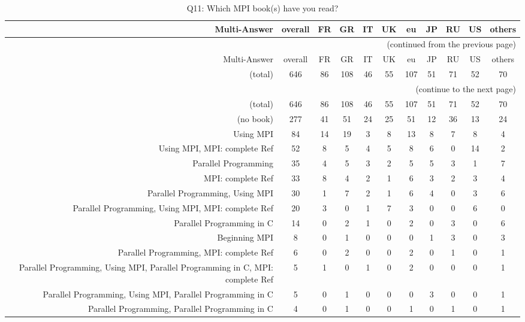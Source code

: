 \clearpage%
{\footnotesize\begin{landscape}%
\begin{longtable}[htb]{r|c|c|c|c|c|c|c|c|c|c}%
\caption{Q11: Which MPI book(s) have you read?}%
\label{tab:Q11-mans} \\%
\hline%
Multi-Answer & overall & FR & GR & IT & UK & eu & JP & RU & US & others \\
 \hline%
\endfirsthead%
\multicolumn{11}{r}{(continued from the previous page)}\\%
\hline%
Multi-Answer & overall & FR & GR & IT & UK & eu & JP & RU & US & others \\
 \hline%
\endhead%
\hline%
(total) & 646 & 86 & 108 & 46 & 55 & 107 & 51 & 71 & 52 & 70 \\%
\hline%
\multicolumn{11}{r}{(continue to the next page)}\\%
\endfoot%
\hline%
(total) & 646 & 86 & 108 & 46 & 55 & 107 & 51 & 71 & 52 & 70 \\%
\hline%
\endlastfoot%
\hline%
{(no book)} & 277 & 41 & 51 & 24 & 25 & 51 & 12 & 36 & 13 & 24 \\%
{Using MPI} & 84 & 14 & 19 & 3 & 8 & 13 & 8 & 7 & 8 & 4 \\%
{Using MPI, MPI: complete Ref} & 52 & 8 & 5 & 4 & 5 & 8 & 6 & 0 & 14 & 2 \\%
{Parallel Programming} & 35 & 4 & 5 & 3 & 2 & 5 & 5 & 3 & 1 & 7 \\%
{MPI: complete Ref} & 33 & 8 & 4 & 2 & 1 & 6 & 3 & 2 & 3 & 4 \\%
{Parallel Programming, Using MPI} & 30 & 1 & 7 & 2 & 1 & 6 & 4 & 0 & 3 & 6 \\%
{Parallel Programming, Using MPI, MPI: complete Ref} & 20 & 3 & 0 & 1 & 7 & 3 & 0 & 0 & 6 & 0 \\%
{Parallel Programming in C} & 14 & 0 & 2 & 1 & 0 & 2 & 0 & 3 & 0 & 6 \\%
{Beginning MPI} & 8 & 0 & 1 & 0 & 0 & 0 & 1 & 3 & 0 & 3 \\%
{Parallel Programming, MPI: complete Ref} & 6 & 0 & 2 & 0 & 0 & 2 & 0 & 1 & 0 & 1 \\%
{Parallel Programming, Using MPI, Parallel Programming in C, MPI: complete Ref} & 5 & 1 & 0 & 1 & 0 & 2 & 0 & 0 & 0 & 1 \\%
{Parallel Programming, Using MPI, Parallel Programming in C} & 5 & 0 & 1 & 0 & 0 & 0 & 3 & 0 & 0 & 1 \\%
{Parallel Programming, Parallel Programming in C} & 4 & 0 & 1 & 0 & 0 & 1 & 0 & 1 & 0 & 1 \\%

\end{longtable}
\end{landscape}}
